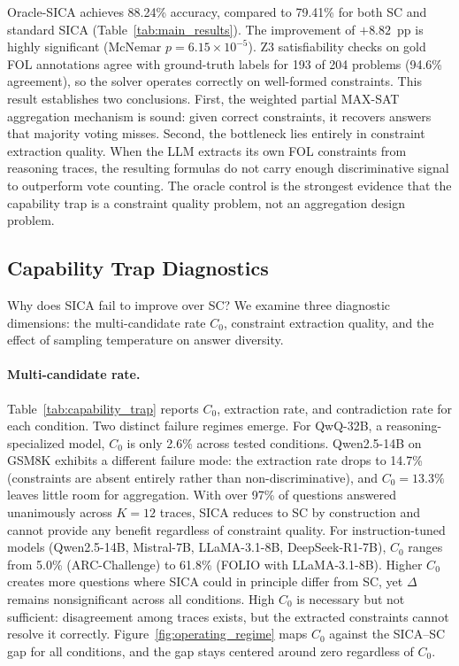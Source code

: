 Oracle-SICA achieves 88.24\% accuracy, compared to 79.41\% for both SC and standard SICA (Table~\ref{tab:main_results}). The improvement of $+8.82$~pp is highly significant (McNemar $p = 6.15 \times 10^{-5}$). Z3 satisfiability checks on gold FOL annotations agree with ground-truth labels for 193 of 204 problems (94.6\% agreement), so the solver operates correctly on well-formed constraints. This result establishes two conclusions. First, the weighted partial MAX-SAT aggregation mechanism is sound: given correct constraints, it recovers answers that majority voting misses. Second, the bottleneck lies entirely in constraint extraction quality. When the LLM extracts its own FOL constraints from reasoning traces, the resulting formulas do not carry enough discriminative signal to outperform vote counting. The oracle control is the strongest evidence that the capability trap is a constraint quality problem, not an aggregation design problem.


\subsection{Capability Trap Diagnostics}
\label{sec:diagnostics}

Why does SICA fail to improve over SC? We examine three diagnostic dimensions: the multi-candidate rate $C_0$, constraint extraction quality, and the effect of sampling temperature on answer diversity.

\paragraph{Multi-candidate rate.} Table~\ref{tab:capability_trap} reports $C_0$, extraction rate, and contradiction rate for each condition. Two distinct failure regimes emerge. For QwQ-32B, a reasoning-specialized model, $C_0$ is only 2.6\% across tested conditions. Qwen2.5-14B on GSM8K exhibits a different failure mode: the extraction rate drops to 14.7\% (constraints are absent entirely rather than non-discriminative), and $C_0 = 13.3\%$ leaves little room for aggregation. With over 97\% of questions answered unanimously across $K=12$ traces, SICA reduces to SC by construction and cannot provide any benefit regardless of constraint quality. For instruction-tuned models (Qwen2.5-14B, Mistral-7B, LLaMA-3.1-8B, DeepSeek-R1-7B), $C_0$ ranges from 5.0\% (ARC-Challenge) to 61.8\% (FOLIO with LLaMA-3.1-8B). Higher $C_0$ creates more questions where SICA could in principle differ from SC, yet $\Delta$ remains nonsignificant across all conditions. High $C_0$ is necessary but not sufficient: disagreement among traces exists, but the extracted constraints cannot resolve it correctly. Figure~\ref{fig:operating_regime} maps $C_0$ against the SICA--SC gap for all conditions, and the gap stays centered around zero regardless of $C_0$.

